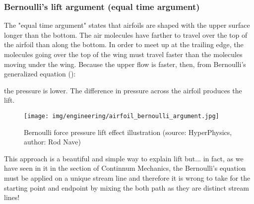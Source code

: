 	\subsubsection{Bernoulli's lift argument (equal time argument)}
	The "equal time argument" states that airfoils are shaped with the upper surface longer than the bottom. The air molecules have farther to travel over the top of the airfoil than along the bottom. In order to meet up at the trailing edge, the molecules going over the top of the wing must travel faster than the molecules moving under the wing. Because the upper flow is faster, then, from Bernoulli's generalized equation ():
	
	the pressure is lower. The difference in pressure across the airfoil produces the lift.
	\begin{figure}[H]
		\centering
		\texttt{[image: img/engineering/airfoil\_bernoulli\_argument.jpg]}
		\caption[Bernoulli force pressure lift effect illustration]{Bernoulli force pressure lift effect illustration (source: HyperPhysics, author: Rod Nave)}
	\end{figure}
	This approach is a beautiful and simple way to explain lift but... in fact, as we have seen in it in the section of Continnum Mechanics, the Bernoulli's equation must be applied on a unique stream line and therefore it is wrong to take for the starting point and endpoint by mixing the both path as they are distinct stream lines!
	
